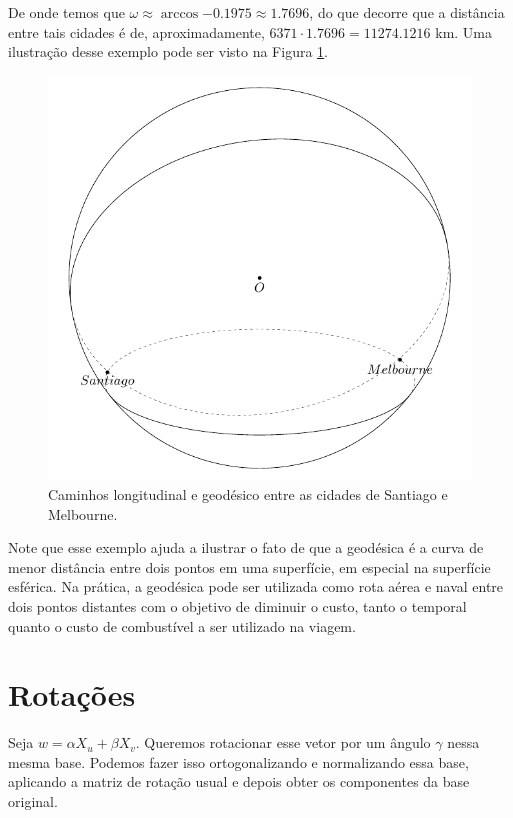 \documentclass{article}
\begin{document}
De onde temos que $\omega\approx \arccos{-0.1975}\approx 1.7696$, do que decorre que a distância entre tais cidades é de, aproximadamente, $6371\cdot 1.7696 = 11274.1216$ km. Uma ilustração desse exemplo pode ser visto na Figura \ref{example}.
\begin{figure}
    \centering
    \includegraphics{Imagens/Tikz.pdf}
    \caption{Caminhos longitudinal e geodésico entre as cidades de Santiago e Melbourne.}
    \label{example}
\end{figure}

Note que esse exemplo ajuda a ilustrar o fato de que a geodésica é a curva de menor distância entre dois pontos em uma superfície, em especial na superfície esférica. Na prática, a geodésica pode ser utilizada como rota aérea e naval entre dois pontos distantes com o objetivo de diminuir o custo, tanto o temporal quanto o custo de combustível a ser utilizado na viagem.

\section{Rotações}
Seja $w = \alpha X_u + \beta X_v$. Queremos rotacionar esse vetor por um ângulo $\gamma$ nessa mesma base. Podemos fazer isso ortogonalizando e normalizando essa base, aplicando a matriz de rotação usual e depois obter os componentes da base original.
\end{document}
